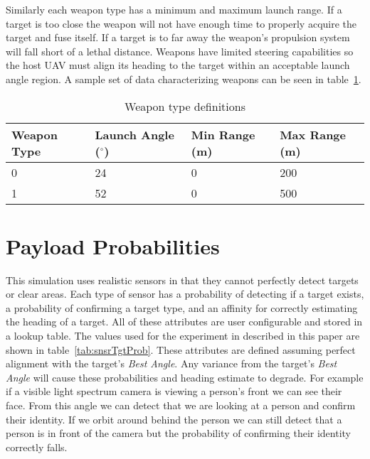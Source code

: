 Similarly each weapon type has a minimum and maximum launch range.  If a target is too close the weapon will not have enough time to properly acquire the target and fuse itself.  If a target is to far away the weapon's propulsion system will fall short of a lethal distance.  Weapons have limited steering capabilities so the host UAV must align its heading to the target within an acceptable launch angle region. A sample set of data characterizing weapons can be seen in table~\ref{tab:weaponType}.


\begin{table}[H]
	\caption{Weapon type definitions}
	\centering
	\label{tab:weaponType}
	\begin{tabular}{|p{1.4cm}|p{1.6cm}|p{1.2cm}|p{1.2cm}|}
		\hline
		Weapon Type & Launch Angle ($^{\circ}$) & Min Range (m) & Max Range (m)\\ \hline
		0 & 24 & 0 & 200 \\
		1 & 52 & 0 & 500 \\
		\hline
	\end{tabular}
\end{table}

\section{Payload Probabilities}
This simulation uses realistic sensors in that they cannot perfectly detect targets or clear areas.  Each type of sensor has a probability of detecting if a target exists, a probability of confirming a target type, and an affinity for correctly estimating the heading of a target.  All of these attributes are user configurable and stored in a lookup table.  The values used for the experiment in described in this paper are shown in table~\ref{tab:snsrTgtProb}.  These attributes are defined assuming perfect alignment with the target's \textit{Best Angle}.  Any variance from the target's \textit{Best Angle} will cause these probabilities and heading estimate to degrade.  For example if a visible light spectrum camera is viewing a person's front we can see their face.  From this angle we can detect that we are looking at a person and confirm their identity.  If we orbit around behind the person we can still detect that a person is in front of the camera but the probability of confirming their identity correctly falls.

